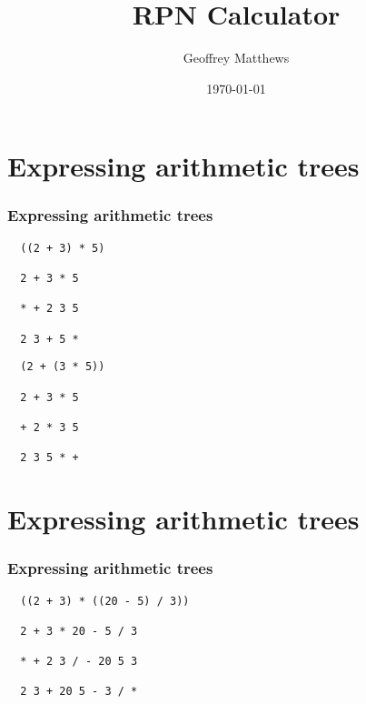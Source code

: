 \documentclass{beamer}
\title[RPN Calculator]
{
RPN Calculator
}
\subtitle{} %
\author[Geoffrey Matthews]
{Geoffrey Matthews}
\institute[WWU/CS]
{
  Department of Computer Science\\
  Western Washington University
}
\date{\today}
\newcommand{\sect}[1]{
\section{#1}
\begin{frame}[fragile]\frametitle{#1}
}
\begin{document}
\begin{frame}
  \titlepage
\end{frame}

\sect{Expressing arithmetic trees}

\hfill
\begin{minipage}[b]{2.5in}\footnotesize
\begin{verbatim}
  ((2 + 3) * 5)

  2 + 3 * 5

  * + 2 3 5

  2 3 + 5 *
\end{verbatim}
\end{minipage}

\vfill

\hrulefill

\vfill

\hfill
\begin{minipage}[b]{2.5in}\footnotesize
\begin{verbatim}
  (2 + (3 * 5))

  2 + 3 * 5

  + 2 * 3 5

  2 3 5 * +
\end{verbatim}
\end{minipage}
\end{frame}


\sect{Expressing arithmetic trees}
\hfill
\begin{minipage}[b]{2.5in}\footnotesize
\begin{verbatim}
  ((2 + 3) * ((20 - 5) / 3))

  2 + 3 * 20 - 5 / 3

  * + 2 3 / - 20 5 3

  2 3 + 20 5 - 3 / *
\end{verbatim}
\end{minipage}

\end{frame}
\end{document}
